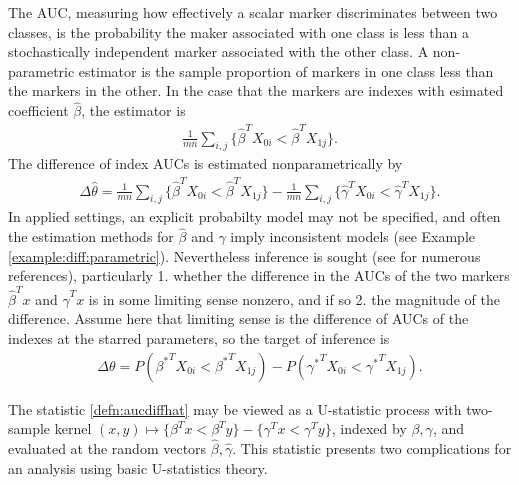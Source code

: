\documentclass[12pt]{article}
\renewcommand{\P}{P}
\newcommand{\X}[1][]{X_{0#1}}
\newcommand{\Y}[1][]{X_{1#1}}
\renewcommand{\t}[1]{{#1}^T}
\renewcommand{\star}[1]{{#1}^\ast}
\newcommand{\m}{m}
\newcommand{\n}{n}
\newcommand{\auc}{\theta}
\newcommand{\aucdiff}{\Delta\auc}
\newcommand{\aucdiffhat}{\Delta\hat{\auc}}
\newcommand{\kernel}[2]{\{#1 < #2\}}
\theoremstyle{definition}
\begin{document}
The AUC, measuring how effectively a scalar marker discriminates
between two classes, is the probability the maker associated with one
class is less than a stochastically independent marker associated with
the other class. A non-parametric estimator is the sample proportion
of markers in one class less than the markers in the other. In the
case that the markers are indexes with esimated coefficient
$\hat\beta$, the estimator is
\begin{align}
   \frac{1}{\m\n}\sum_{i,j}\kernel{\t{\hat\beta}\X[i]}{\t{\hat\beta}\Y[j]}.\label{defn:auchat}
\end{align}
The difference of index AUCs is  estimated nonparametrically by
\begin{align}
  \aucdiffhat=\frac{1}{\m\n}\sum_{i,j}\kernel{\t{\hat\beta}\X[i]}{\t{\hat\beta}\Y[j]}
  -  \frac{1}{\m\n}\sum_{i,j}\kernel{\t{\hat\gamma}\X[i]}{\t{\hat\gamma}\Y[j]} . \label{defn:aucdiffhat}
\end{align}
In applied settings, an explicit probabilty model may not be
specified, and often the estimation methods for $\hat\beta$ and
$\hat\gamma$ imply inconsistent
models (see Example \ref{example:diff:parametric}). %
 Nevertheless inference is
sought (see \citet{seshan2013} for numerous references), particularly 1. whether the difference
in the AUCs of the two markers $\t{\hat\beta} x$ and
$\t{\hat\gamma} x$ is in some limiting sense nonzero, and if so 2. the
magnitude of the difference. Assume here that limiting sense is the
difference of AUCs of the indexes at the starred parameters,
so the target of inference is%
\begin{align}
  \aucdiff=\P(\t{\star\beta}\X[i]<\t{\star\beta}\Y[j])
- \P(\t{\star\gamma}\X[i]<\t{\star\gamma}\Y[j]).\label{defn:aucdiff}
\end{align}

The statistic \eqref{defn:aucdiffhat} may be viewed as a U-statistic process with
two-sample kernel
$(x,y)\mapsto \kernel{\t\beta x}{\t\beta y} - \kernel{\t\gamma x }{
  \t\gamma y}$, indexed by $\beta,\gamma$, and evaluated at the random
vectors $\hat\beta,\hat\gamma$. This statistic presents two
complications for an analysis using basic U-statistics theory.
\end{document}
